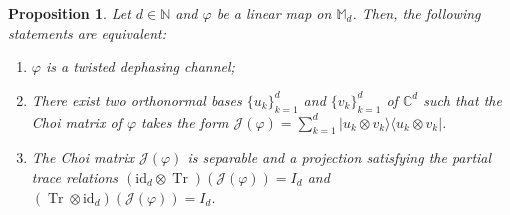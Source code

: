 \documentclass[11pt,reqno]{amsart}
\theoremstyle{definition}
\theoremstyle{plain}
\newtheorem{prop}[defn]{Proposition}
\theoremstyle{remark}
\newcommand{\la}{\langle}
\newcommand{\ra}{\rangle}
\numberwithin{equation}{section}%
\begin{document}
\begin{prop}\label{ChoiMatrixofTDchannels}
    Let $d\in\mathbb{N}$ and $\varphi$ be a linear map on $\mathbb{M}_d$. Then, the following statements are equivalent:
    \begin{enumerate}
        \item $\varphi$ is a twisted dephasing channel;
        \item There exist two orthonormal bases $\{u_k\}_{k=1}^d$ and $\{v_k\}_{k=1}^d$ of $\mathbb{C}^d$ such that the Choi matrix of $\varphi$ takes the form $\mathcal{J}(\varphi)=\sum_{k=1}^d |u_k\otimes v_k\ra\la u_k\otimes v_k|$.
        \item The Choi matrix $\mathcal{J}(\varphi)$ is separable and a projection satisfying the partial trace relations $(\text{id}_d\otimes \operatorname{Tr})(\mathcal{J}(\varphi))=I_d$ and $(\operatorname{Tr}\otimes\text{id}_d)(\mathcal{J}(\varphi))=I_d$.
    \end{enumerate}
\end{prop}
\end{document}
